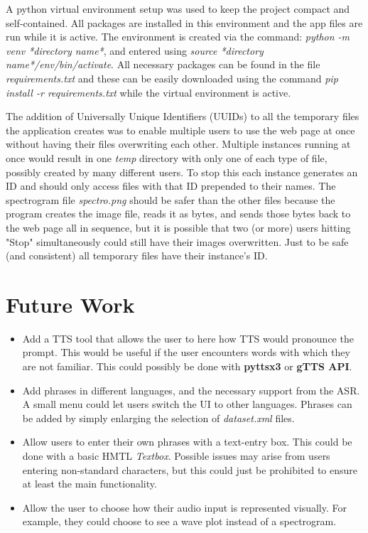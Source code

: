 \documentclass[12pt, letterpaper]{article}
\begin{document}
A python virtual environment setup was used to keep the project compact and self-contained. All packages are installed in this environment and the app files are run while it is active. The environment is created via the command: \textit{python -m venv *directory name*}, and entered using \textit{source *directory name*/env/bin/activate}. All necessary packages can be found in the file \textit{requirements.txt} and these can be easily downloaded using the command \textit{pip install -r requirements.txt} while the virtual environment is active.

The addition of Universally Unique Identifiers (UUIDs) to all the temporary files the application creates was to enable multiple users to use the web page at once without having their files overwriting each other. Multiple instances running at once would result in one \textit{temp} directory with only one of each type of file, possibly created by many different users. To stop this each instance generates an ID and should only access files with that ID prepended to their names. The spectrogram file \textit{spectro.png} should be safer than the other files because the program creates the image file, reads it as bytes, and sends those bytes back to the web page all in sequence, but it is possible that two (or more) users hitting "Stop" simultaneously could still have their images overwritten. Just to be safe  (and consistent) all temporary files have their instance's ID.

\section*{Future Work}
\begin{itemize}
\item{Add a TTS tool that allows the user to here how TTS would pronounce the prompt. This would be useful if the user encounters words with which they are not familiar. This could possibly be done with \textbf{pyttsx3} or \textbf{gTTS API}.}

\item{Add phrases in different languages, and the necessary support from the ASR. A small menu could let users switch the UI to other languages. Phrases can be added by simply enlarging the selection of \textit{dataset.xml} files.}

\item{Allow users to enter their own phrases with a text-entry box. This could be done with a basic HMTL \textit{Textbox}. Possible issues may arise from users entering non-standard characters, but this could just be prohibited to ensure at least the main functionality.}

\item{Allow the user to choose how their audio input is represented visually. For example, they could choose to see a wave plot instead of a spectrogram.}
\end{itemize}
\end{document}

